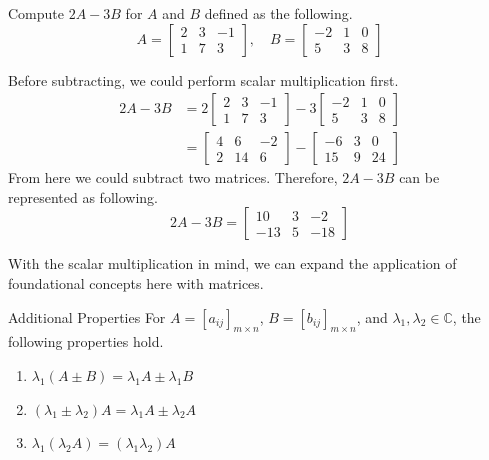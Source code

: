 \documentclass[../main.tex]{subfiles}
\begin{document}
\begin{problem}
Compute $2A - 3B$ for $A$ and $B$ defined as the following.
\[
A =
\begin{bmatrix}
    2 & 3 & -1 \\
    1 & 7 & 3
\end{bmatrix},
\quad
B =
\begin{bmatrix}
    -2 & 1 & 0 \\
    5  & 3 & 8
\end{bmatrix}
\]
\end{problem}
\begin{solution}
Before subtracting, we could perform scalar multiplication first.
\begin{align*}
2A - 3B
&=
2\begin{bmatrix}
    2 & 3 & -1 \\
    1 & 7 & 3
\end{bmatrix}
-
3\begin{bmatrix}
    -2 & 1 & 0 \\
    5  & 3 & 8
\end{bmatrix} \\
&=
\begin{bmatrix}
    4 & 6  & -2 \\
    2 & 14 & 6
\end{bmatrix}
-
\begin{bmatrix}
    -6 & 3 & 0 \\
    15 & 9 & 24
\end{bmatrix}
\end{align*}
From here we could subtract two matrices. Therefore, $2A - 3B$
can be represented as following.
\[
2A - 3B =
\begin{bmatrix}
    10  & 3  & -2 \\
    -13 & 5 & -18
\end{bmatrix}
\]
\end{solution}

With the scalar multiplication in mind, we can expand the application
of foundational concepts here with matrices.

\begin{theorem}{Additional Properties}
For $A = [a_{ij}]_{m \times n}$, $B = [b_{ij}]_{m \times n}$,
and $\lambda_1, \lambda_2 \in \mathbb{C}$, the following
properties hold.
\begin{enumerate}
\item $\lambda_1 (A \pm B) = \lambda_1 A \pm \lambda_1 B$
\item $(\lambda_1 \pm \lambda_2) A = \lambda_1 A \pm \lambda_2 A$
\item $\lambda_1 (\lambda_2 A) = (\lambda_1 \lambda_2) A$
\end{enumerate}
\end{theorem}
\end{document}

